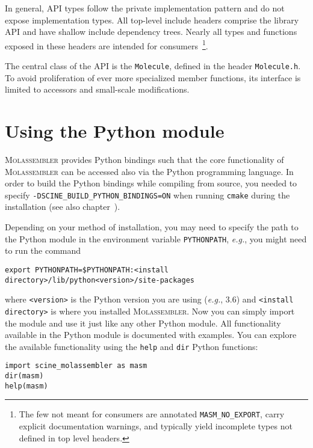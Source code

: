 \documentclass[]{tufte-book}
\begin{document}
In general, API types follow the private implementation pattern and do not
expose implementation types. All top-level include headers comprise the library
API and have shallow include dependency trees. Nearly all types and functions
exposed in these headers are intended for consumers~\footnote{The few not meant
for consumers are annotated \texttt{MASM\_NO\_EXPORT}, carry explicit
documentation warnings, and typically yield incomplete types not defined in top
level headers.}.

The central class of the API is the \texttt{Molecule}, defined in the header
\texttt{Molecule.h}. To avoid proliferation of ever more specialized member
functions, its interface is limited to accessors and small-scale modifications.

\newpage
\chapter{Using the Python module}

\textsc{Molassembler} provides Python bindings such that the core functionality
of \textsc{Molassembler} can be accessed also via the Python programming
language. In order to build the Python bindings while compiling from source, you
needed to specify \texttt{-DSCINE\_BUILD\_PYTHON\_BINDINGS=ON} when running
\texttt{cmake} during the installation (see also
chapter~).

Depending on your method of installation, you may need to specify the path to
the Python module in the environment variable \texttt{PYTHONPATH},
\textit{e.g.}, you might need to run the command 

\begin{Verbatim} 
export PYTHONPATH=$PYTHONPATH:<install directory>/lib/python<version>/site-packages 
\end{Verbatim} 

where \texttt{<version>} is the Python version you are using (\textit{e.g.},
3.6) and \texttt{<install directory>} is where you installed
\textsc{Molassembler}. Now you can simply import the module and use it just
like any other Python module. All functionality available in the Python module
is documented with examples. You can explore the available functionality using
the \texttt{help} and \texttt{dir} Python functions:

\begin{Verbatim}
import scine_molassembler as masm
dir(masm)
help(masm)
\end{Verbatim}
\end{document}
